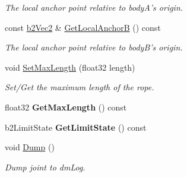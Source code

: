 \begin{DoxyCompactItemize}
\begin{DoxyCompactList}\small\item\em The local anchor point relative to body\-A's origin. \end{DoxyCompactList}\item 
\hypertarget{classb2_rope_joint_a511b297fbebfbecdcdce68e1cffa272c}{const \hyperlink{structb2_vec2}{b2\-Vec2} \& \hyperlink{classb2_rope_joint_a511b297fbebfbecdcdce68e1cffa272c}{Get\-Local\-Anchor\-B} () const }\label{classb2_rope_joint_a511b297fbebfbecdcdce68e1cffa272c}

\begin{DoxyCompactList}\small\item\em The local anchor point relative to body\-B's origin. \end{DoxyCompactList}\item 
\hypertarget{classb2_rope_joint_a92cea201d21acd2f2a7cc9b00e165848}{void \hyperlink{classb2_rope_joint_a92cea201d21acd2f2a7cc9b00e165848}{Set\-Max\-Length} (float32 length)}\label{classb2_rope_joint_a92cea201d21acd2f2a7cc9b00e165848}

\begin{DoxyCompactList}\small\item\em Set/\-Get the maximum length of the rope. \end{DoxyCompactList}\item 
\hypertarget{classb2_rope_joint_a2bee2d2f47a27ab900438ec58d86f9ac}{float32 {\bfseries Get\-Max\-Length} () const }\label{classb2_rope_joint_a2bee2d2f47a27ab900438ec58d86f9ac}

\item 
\hypertarget{classb2_rope_joint_af3653f62379529a43a99e6a8e84f5d43}{b2\-Limit\-State {\bfseries Get\-Limit\-State} () const }\label{classb2_rope_joint_af3653f62379529a43a99e6a8e84f5d43}

\item 
\hypertarget{classb2_rope_joint_a4612dca9851a66701893a48d896dbd14}{void \hyperlink{classb2_rope_joint_a4612dca9851a66701893a48d896dbd14}{Dump} ()}\label{classb2_rope_joint_a4612dca9851a66701893a48d896dbd14}

\begin{DoxyCompactList}\small\item\em Dump joint to dm\-Log. \end{DoxyCompactList}\end{DoxyCompactItemize}
